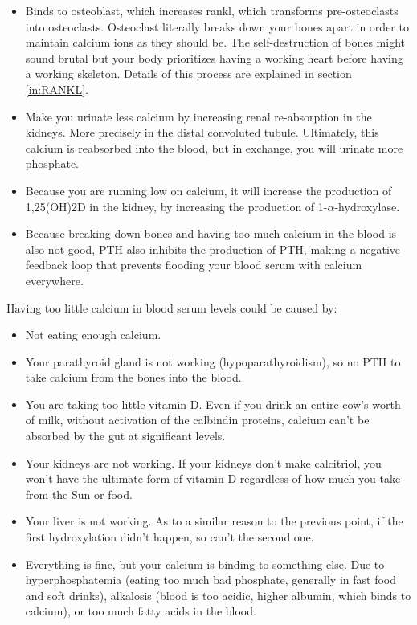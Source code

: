 \begin{itemize}

    \item Binds to osteoblast, which increases \gls{rankl}, which transforms pre-osteoclasts into osteoclasts. Osteoclast literally breaks down your bones apart in order to maintain calcium ions as they should be. The self-destruction of bones might sound brutal but your body prioritizes having a working heart before having a working skeleton. Details of this process are explained in section \ref{in:RANKL}.
    
    \item Make you urinate less calcium by increasing renal re-absorption in the kidneys. More precisely in the distal convoluted tubule. Ultimately, this calcium is reabsorbed into the blood, but in exchange, you will urinate more phosphate.
    
    \item Because you are running low on calcium, it will increase the production of 1,25(OH)2D in the kidney, by increasing the production of 1-$\alpha$-hydroxylase.
    
    \item Because breaking down bones and having too much calcium in the blood is also not good, PTH also inhibits the production of PTH, making a negative feedback loop that prevents flooding your blood serum with calcium everywhere.
    
\end{itemize}

Having too little calcium in blood serum levels could be caused by:

\begin{itemize}

    \item Not eating enough calcium.
    
    \item Your parathyroid gland is not working (hypoparathyroidism), so no PTH to take calcium from the bones into the blood.
    
    \item You are taking too little vitamin D. Even if you drink an entire cow's worth of milk, without activation of the calbindin proteins, calcium can't be absorbed by the gut at significant levels.
    
    \item Your kidneys are not working. If your kidneys don't make calcitriol, you won't have the ultimate form of vitamin D regardless of how much you take from the Sun or food.
    
    \item Your liver is not working. As to a similar reason to the previous point, if the first hydroxylation didn't happen, so can't the second one.
    
    \item Everything is fine, but your calcium is binding to something else. Due to hyperphosphatemia (eating too much bad phosphate, generally in fast food and soft drinks), alkalosis (blood is too acidic, higher albumin, which binds to calcium), or too much fatty acids in the blood.
    
\end{itemize}

